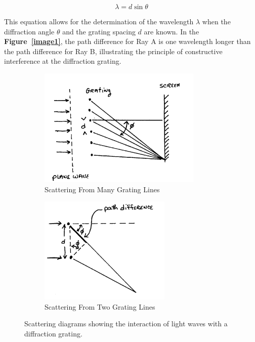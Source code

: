 \documentclass[a4paper,11pt]{article}
\begin{document}
\[
\lambda = d \sin \theta
\]

This equation allows for the determination of the wavelength \( \lambda \) when the diffraction angle \( \theta \) and the grating spacing \(d\) are known. In the \textbf{Figure~\ref{image1}}, the path difference for Ray A is one wavelength longer than the path difference for Ray B, illustrating the principle of constructive interference at the diffraction grating.\\

\begin{figure}[H]
  \centering
  \begin{subfigure}[b]{0.45\textwidth}
      \includegraphics[width=\textwidth]{image2.png}
      \caption{Scattering From Many Grating Lines}
      \label{fig:grating_many_lines}
  \end{subfigure}
  \hfill
  \begin{subfigure}[b]{0.45\textwidth}
      \includegraphics[width=\textwidth]{image3.png}
      \caption{Scattering From Two Grating Lines}
      \label{fig:grating_two_lines}
  \end{subfigure}
  \caption{Scattering diagrams showing the interaction of light waves with a diffraction grating.}
  \label{fig:grating_scattering}
\end{figure}
\end{document}
